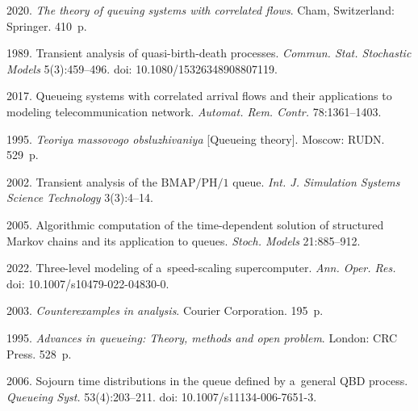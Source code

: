 \begin{multicols}{2}
{{\begin{thebibliography}{99}
 2020.
\textit{The theory of queuing systems
with correlated flows}. Cham, Switzerland: Springer. 410~p.



 1989.
Transient analysis of quasi-birth-death processes.
\textit{Commun. Stat. Stochastic Models} 5(3):459--496. 
doi: 10.1080/15326348908807119.

 2017.
Queueing systems with correlated arrival flows and their applications to modeling telecommunication network. 
\textit{Automat. Rem. Contr.} 78:1361--1403.

 1995.
\textit{Teoriya massovogo obsluzhivaniya} [Queueing theory].
Moscow: RUDN. 529~p.

 2002.
Transient analysis of the ${\mathrm{BMAP}/\mathrm{PH}/1}$ queue.
\textit{Int. J. Simulation Systems Science Technology}
3(3):4--14.

 2005. 
Algorithmic computation of the time-dependent solution of 
structured Markov chains and its application to queues.
\textit{Stoch. Models} 21:885--912.

 2022.
Three-level modeling of a~speed-scaling supercomputer.
\textit{Ann. Oper. Res.} doi: 10.1007/s10479-022-04830-0.

 2003.
\textit{Counterexamples in analysis}. Courier Corporation. 195~p.


 1995.
\textit{Advances in queueing: Theory, methods and open problem}.
London: CRC Press. 528~p. 

 2006.
Sojourn time distributions in the queue defined by a~general QBD process.
\textit{Queueing Syst.} 53(4):203--211.  doi: 10.1007/s11134-006-7651-3.
\end{thebibliography}

 }
 }

\end{multicols}

